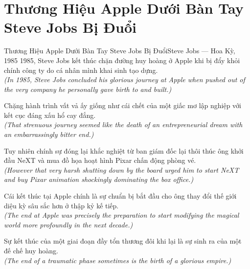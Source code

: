 \section{Thương Hiệu Apple Dưới Bàn Tay Steve Jobs Bị Đuổi}
\begin{truyen}{Thương Hiệu Apple Dưới Bàn Tay Steve Jobs Bị Đuổi}{Steve Jobs --- Hoa Kỳ, 1985}
 1985, Steve Jobs kết thúc chặn đường huy hoàng ở Apple khi bị đẩy khỏi chính công ty do cá nhân mình khai sinh tạo dựng.\\[4pt]
\textit{(In 1985, Steve Jobs concluded his glorious journey at Apple when pushed out of the very company he personally gave birth to and built.)}

Chặng hành trình vất vả ấy giống như cái chết của một giấc mơ lập nghiệp với kết cục đáng xấu hổ cay đắng.\\[4pt]
\textit{(That strenuous journey seemed like the death of an entrepreneurial dream with an embarrassingly bitter end.)}

Tuy nhiên chính sự đóng lại khắc nghiệt từ ban giám đốc lại thôi thúc ông khởi đầu NeXT và mua đồ họa hoạt hình Pixar chấn động phòng vé.\\[4pt]
\textit{(However that very harsh shutting down by the board urged him to start NeXT and buy Pixar animation shockingly dominating the box office.)}

Cái kết thúc tại Apple chính là sự chuẩn bị bắt đầu cho ông thay đổi thế giới diệu kỳ sâu sắc hơn ở thập kỷ kế tiếp.\\[4pt]
\textit{(The end at Apple was precisely the preparation to start modifying the magical world more profoundly in the next decade.)}

\end{truyen}
\begin{baihoc}
  Sự kết thúc của một giai đoạn đầy tổn thương đôi khi lại là sự sinh ra của một đế chế huy hoàng.\\[4pt]
  \textit{(The end of a traumatic phase sometimes is the birth of a glorious empire.)}
\end{baihoc}

